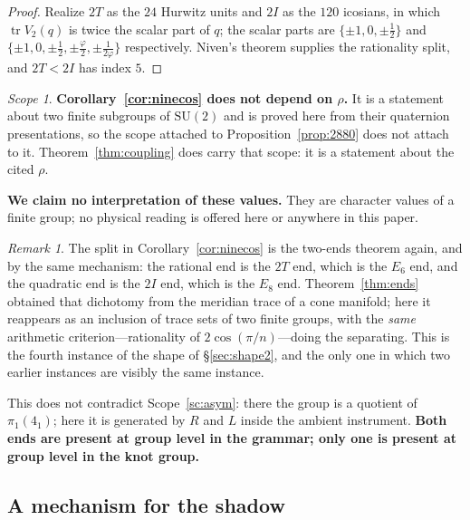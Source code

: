 \documentclass[11pt,reqno]{amsart}
\theoremstyle{plain}
\theoremstyle{definition}
\theoremstyle{remark}
\newtheorem{scope}[theorem]{Scope}
\newtheorem{remark}[theorem]{Remark}
\begin{document}
\begin{proof}
Realize $2T$ as the $24$ Hurwitz units and $2I$ as the $120$ icosians, in which
$\operatorname{tr}V_2(q)$ is twice the scalar part of $q$; the scalar parts are
$\{\pm1,0,\pm\tfrac12\}$ and $\{\pm1,0,\pm\tfrac12,\pm\tfrac\varphi2,
\pm\tfrac1{2\varphi}\}$ respectively. Niven's theorem supplies the rationality split, and
$2T<2I$ has index $5$.
\end{proof}

\begin{scope}\label{sc:couplingscope}
\textbf{Corollary~\ref{cor:ninecos} does not depend on $\rho$.} It is a statement about
two finite subgroups of $\mathrm{SU}(2)$ and is proved here from their quaternion
presentations, so the scope attached to Proposition~\ref{prop:2880} does not attach to
it. Theorem~\ref{thm:coupling} does carry that scope: it is a statement about the cited
$\rho$.

\textbf{We claim no interpretation of these values.} They are character values of a
finite group; no physical reading is offered here or anywhere in this paper.
\end{scope}

\begin{remark}
The split in Corollary~\ref{cor:ninecos} is the two-ends theorem again, and by the same
mechanism: the rational end is the $2T$ end, which is the $E_6$ end, and the quadratic
end is the $2I$ end, which is the $E_8$ end. Theorem~\ref{thm:ends} obtained that
dichotomy from the meridian trace of a cone manifold; here it reappears as an
inclusion of trace sets of two finite groups, with the \emph{same} arithmetic
criterion---rationality of $2\cos(\pi/n)$---doing the separating. This is the fourth
instance of the shape of \S\ref{sec:shape2}, and the only one in which two earlier
instances are visibly the same instance.
\end{remark}

This does not contradict Scope~\ref{sc:asym}: there the group is a quotient of
$\pi_1(4_1)$; here it is generated by $R$ and $L$ inside the ambient instrument.
\textbf{Both ends are present at group level in the grammar; only one is present at
group level in the knot group.}

\subsection{A mechanism for the shadow}
\end{document}

